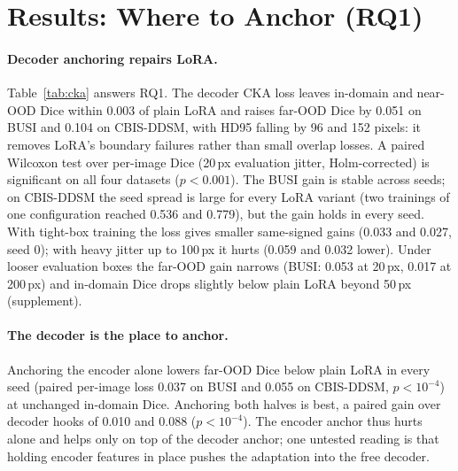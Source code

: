 \section{Results: Where to Anchor (RQ1)}
\label{sec:res_cka}

\begin{table}[tbp]
  \centering
  \caption{Tight-box Dice after adaptation on ISIC with 20\,px box jitter, mean $\pm$ std over seeds 0 to 2. CKA rows add Eq.~\eqref{eq:loss} to LoRA with hooks on the encoder, the decoder or both.}
  \label{tab:cka}
  \small\setlength{\tabcolsep}{4.5pt}
  
\end{table}

\paragraph{Decoder anchoring repairs LoRA.}
Table~\ref{tab:cka} answers RQ1. The decoder CKA loss leaves in-domain and near-OOD Dice within 0.003 of plain LoRA and raises far-OOD Dice by 0.051 on BUSI and 0.104 on CBIS-DDSM, with HD95 falling by 96 and 152 pixels: it removes LoRA's boundary failures rather than small overlap losses. A paired Wilcoxon test over per-image Dice (20\,px evaluation jitter, Holm-corrected) is significant on all four datasets ($p < 0.001$). The BUSI gain is stable across seeds; on CBIS-DDSM the seed spread is large for every LoRA variant (two trainings of one configuration reached 0.536 and 0.779), but the gain holds in every seed. With tight-box training the loss gives smaller same-signed gains (0.033 and 0.027, seed 0); with heavy jitter up to 100\,px it hurts (0.059 and 0.032 lower). Under looser evaluation boxes the far-OOD gain narrows (BUSI: 0.053 at 20\,px, 0.017 at 200\,px) and in-domain Dice drops slightly below plain LoRA beyond 50\,px (supplement).

\paragraph{The decoder is the place to anchor.}
Anchoring the encoder alone lowers far-OOD Dice below plain LoRA in every seed (paired per-image loss 0.037 on BUSI and 0.055 on CBIS-DDSM, $p < 10^{-4}$) at unchanged in-domain Dice. Anchoring both halves is best, a paired gain over decoder hooks of 0.010 and 0.088 ($p < 10^{-4}$). The encoder anchor thus hurts alone and helps only on top of the decoder anchor; one untested reading is that holding encoder features in place pushes the adaptation into the free decoder.

